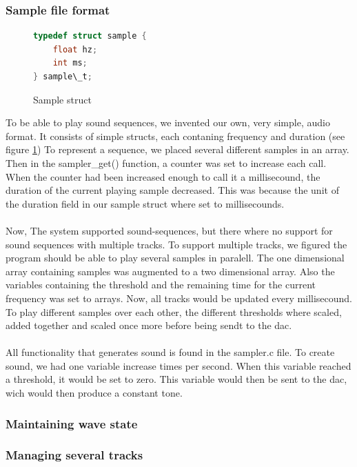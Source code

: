 \subsubsection{Sample file format}
\begin{figure}[h]
	\centering
	\begin{lstlisting}[language=C]
typedef struct sample {
	float hz;
	int ms;
} sample\_t;
	\end{lstlisting}
	\caption{Sample struct}
	\label{file_format_struct}
\end{figure}
To be able to play sound sequences, we invented our own, very simple, audio format. It consists of simple structs, each contaning frequency and duration (see figure \ref{file_format_struct}) To represent a sequence, we placed several different samples in an array. Then in the sampler\_get() function, a counter was set to increase each call. When the counter had been increased enough to call it a millisecound, the duration of the current playing sample decreased. This was because the  unit of the duration field in our sample struct where set to millisecounds.\\
\\
Now, The system supported sound-sequences, but there where no support for sound sequences with multiple tracks. To support multiple tracks, we figured the program should be able to play several samples in paralell. The one dimensional array containing samples was augmented to a two dimensional array. Also the variables containing the threshold and the remaining time for the current frequency was set to arrays. Now, all tracks would be updated every millisecound. To play different samples over each other, the different thresholds where scaled, added together and scaled once more before being sendt to the dac.\\
\\
All functionality that generates sound is found in the sampler.c file. To create sound, we had one variable increase \samplerPullsPerSecound times per second. When this variable reached a threshold, it would be set to zero. This variable would then be sent to the dac, wich would then produce a constant tone. \\

\subsubsection{Maintaining wave state}

\subsubsection{Managing several tracks}

